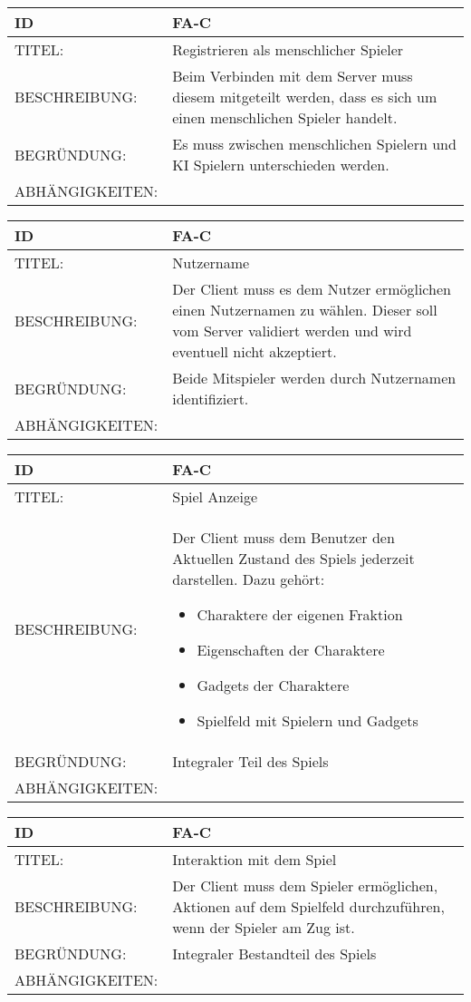\begin{tabularx}{16cm}{l|X}
\textbf{ID} & \textbf{FA-C} \\
\hline
TITEL: & Registrieren als menschlicher Spieler \\
\hline 
BESCHREIBUNG: & Beim Verbinden mit dem Server muss diesem mitgeteilt werden, dass es sich um einen menschlichen Spieler handelt. \\
\hline
BEGRÜNDUNG: & Es muss zwischen menschlichen Spielern und KI Spielern unterschieden werden. \\
\hline
ABHÄNGIGKEITEN: & \\
\end{tabularx}

\begin{tabularx}{16cm}{l|X}
\textbf{ID} & \textbf{FA-C} \\
\hline
TITEL: & Nutzername \\
\hline 
BESCHREIBUNG: & Der Client muss es dem Nutzer ermöglichen einen Nutzernamen zu wählen. Dieser soll vom Server validiert werden und wird eventuell nicht akzeptiert. \\
\hline
BEGRÜNDUNG: & Beide Mitspieler werden durch Nutzernamen identifiziert. \\
\hline
ABHÄNGIGKEITEN: & \\
\end{tabularx}

\begin{tabularx}{16cm}{l|X}
\textbf{ID} & \textbf{FA-C} \\
\hline
TITEL: & Spiel Anzeige \\
\hline 
BESCHREIBUNG: & Der Client muss dem Benutzer den Aktuellen Zustand des Spiels jederzeit darstellen. Dazu gehört:
\begin{itemize}
    \item Charaktere der eigenen Fraktion
    \item Eigenschaften der Charaktere
    \item Gadgets der Charaktere
    \item Spielfeld mit Spielern und Gadgets
\end{itemize} \\
\hline
BEGRÜNDUNG: & Integraler Teil des Spiels \\
\hline
ABHÄNGIGKEITEN: & \\
\end{tabularx}

\begin{tabularx}{16cm}{l|X}
\textbf{ID} & \textbf{FA-C} \\
\hline
TITEL: & Interaktion mit dem Spiel \\
\hline 
BESCHREIBUNG: & Der Client muss dem Spieler ermöglichen, Aktionen auf dem Spielfeld durchzuführen, wenn der Spieler am Zug ist. \\
\hline
BEGRÜNDUNG: & Integraler Bestandteil des Spiels \\
\hline
ABHÄNGIGKEITEN: & \\
\end{tabularx}

